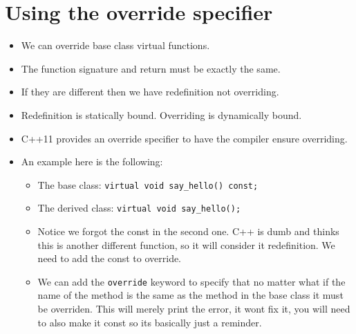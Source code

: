 \section{Using the override specifier}
\begin{itemize}
    \item We can override base class virtual functions. 
    \item The function signature and return must be exactly the same. 
    \item If they are different then we have redefinition not overriding.
    \item Redefinition is statically bound. Overriding is dynamically bound.
    \item C++11 provides an override specifier to have the compiler ensure overriding.
    \item An example here is the following:
        \begin{itemize}
            \item The base class: \texttt{virtual void say_hello() const;} 
            \item The derived class: \texttt{virtual void say_hello();}
            \item Notice we forgot the const in the second one. C++ is dumb and thinks this is another different function, so it will consider it redefinition. We need to add the const to override.
            \item We can add the \texttt{override} keyword to specify that no matter what if the name of the method is the same as the method in the base class it must be overriden. This will merely print the error, it wont fix it, you will need to also make it const so its basically just a reminder.
        \end{itemize}
\end{itemize}

